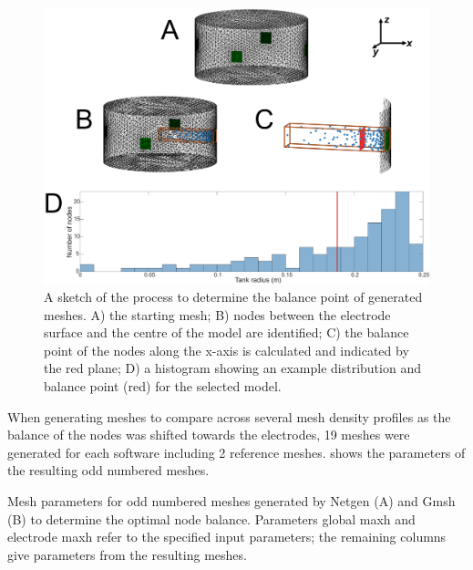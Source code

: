 \begin{figure}
  \includegraphics[width=\columnwidth]{chapter4-mesh_refinement/imgs/balance_methods.pdf}
  \caption[Balance point calculation method]{\label{fig:balanceMethods} A sketch of the process to determine the 
  balance point of generated meshes. A) the starting mesh; B) nodes between the
  electrode surface and the centre of the model are identified; C) the 
  balance point of the nodes along the x-axis is calculated and indicated 
  by the red plane; D) a histogram showing an example distribution and balance point (red)
  for the selected model.}
\end{figure}

When generating meshes to compare across several mesh density profiles as the balance of the nodes was shifted 
towards the electrodes, 19 meshes were generated for each software including 2 reference meshes. 
 shows the parameters of the resulting odd numbered meshes. 

\begin{table}[]
\caption[Parameters used to generate meshes]{\label{tab:mesh-table}Mesh parameters for odd numbered meshes generated by Netgen (A) and Gmsh (B) 
to determine the optimal 
node balance. Parameters global maxh and electrode maxh refer to the specified input parameters; the remaining 
columns give parameters from the resulting meshes.}

\end{table}

%
%
%

